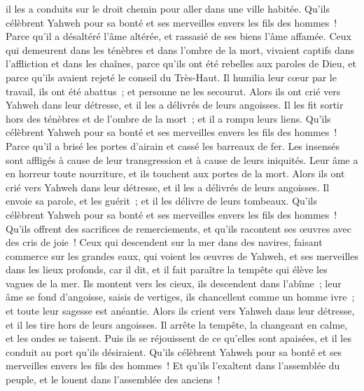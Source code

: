 \begin{multicols}{2}
il les a conduits sur le droit chemin pour aller dans une ville habitée.
Qu'ils célèbrent Yahweh pour sa bonté et ses merveilles envers les fils des hommes~!
Parce qu'il a désaltéré l'âme altérée, et rassasié de ses biens l'âme affamée.
Ceux qui demeurent dans les ténèbres et dans l'ombre de la mort, vivaient captifs dans l'affliction et dans les chaînes,
parce qu'ils ont été rebelles aux paroles de Dieu, et parce qu'ils avaient rejeté le conseil du Très-Haut.
Il humilia leur cœur par le travail, ils ont été abattus~; et personne ne les secourut.
Alors ils ont crié vers Yahweh dans leur détresse, et il les a délivrés de leurs angoisses.
Il les fit sortir hors des ténèbres et de l'ombre de la mort~; et il a rompu leurs liens.
Qu'ils célèbrent Yahweh pour sa bonté et ses merveilles envers les fils des hommes~!
Parce qu'il a brisé les portes d'airain et cassé les barreaux de fer.
Les insensés sont affligés à cause de leur transgression et à cause de leurs iniquités.
Leur âme a en horreur toute nourriture, et ils touchent aux portes de la mort.
Alors ils ont crié vers Yahweh dans leur détresse, et il les a délivrés de leurs angoisses.
Il envoie sa parole, et les guérit~; et il les délivre de leurs tombeaux.
Qu'ils célèbrent Yahweh pour sa bonté et ses merveilles envers les fils des hommes~!
Qu'ils offrent des sacrifices de remerciements, et qu'ils racontent ses œuvres avec des cris de joie~!
Ceux qui descendent sur la mer dans des navires, faisant commerce sur les grandes eaux,
qui voient les œuvres de Yahweh, et ses merveilles dans les lieux profonds,
car il dit, et il fait paraître la tempête qui élève les vagues de la mer.
Ils montent vers les cieux, ils descendent dans l'abîme~; leur âme se fond d'angoisse,
saisis de vertiges, ils chancellent comme un homme ivre~; et toute leur sagesse est anéantie.
Alors ils crient vers Yahweh dans leur détresse, et il les tire hors de leurs angoisses.
Il arrête la tempête, la changeant en calme, et les ondes se taisent.
Puis ils se réjouissent de ce qu'elles sont apaisées, et il les conduit au port qu'ils désiraient.
Qu'ils célèbrent Yahweh pour sa bonté et ses merveilles envers les fils des hommes~!
Et qu'ils l'exaltent dans l'assemblée du peuple, et le louent dans l'assemblée des anciens~!

\end{multicols}
